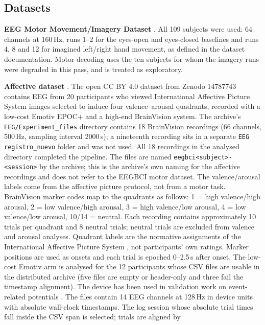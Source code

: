 \subsection*{Datasets}
\textbf{EEG Motor Movement/Imagery Dataset} \citep{schalk2009eegbci}. All 109 subjects were used: 64 channels at 160\,Hz, runs 1--2 for the
eyes-open and eyes-closed baselines and runs 4, 8 and 12 for imagined left/right hand
movement, as defined in the dataset documentation. Motor decoding uses the ten subjects for whom the imagery runs
were degraded in this pass, and is treated as exploratory.

\textbf{Affective dataset} \citep{sanchezreolid2022emotion,sanchezreolid2025dataset}.
The open CC BY 4.0 dataset from Zenodo 14787743 contains EEG from 20 participants who
viewed International Affective Picture System images selected to induce four
valence--arousal quadrants, recorded with a low-cost Emotiv EPOC+ and a high-end
BrainVision system. The archive's \texttt{EEG/Experiment\_files} directory contains 18 BrainVision
recordings (66 channels, 500\,Hz, sampling interval 2000\,\textmu s); a nineteenth
recording sits in a separate \texttt{EEG registro\_nuevo} folder and was not used. All
18 recordings in the analysed directory completed the pipeline. The files are named
\texttt{eegbci<subject>-<session>} by the archive; this is the archive's own naming for
the affective recordings and does not refer to the EEGBCI motor dataset. The
valence/arousal labels come from the affective picture protocol, not from a motor task. BrainVision
marker codes map to the quadrants as follows: 1 = high valence/high arousal,
2 = low valence/high arousal, 3 = high valence/low arousal, 4 = low valence/low
arousal, 10/14 = neutral. Each recording contains approximately 10 trials per quadrant
and 8 neutral trials; neutral trials are excluded from valence and arousal analyses.
Quadrant labels are the normative assignments of the International Affective Picture
System \citep{lang2008iaps}, not participants' own ratings.
Marker positions are used as onsets and each trial is epoched 0--2.5\,s after onset.
The low-cost Emotiv arm is analysed for the 12 participants whose CSV files are
usable in the distributed archive (five files are empty or header-only and three fail
the timestamp alignment). The device has been used in validation work on
event-related potentials \citep{badcock2015emotiv}. The files contain 14 EEG channels at
128\,Hz in device units with absolute wall-clock timestamps. The log session whose
absolute trial times fall inside the CSV span is selected; trials are aligned by
